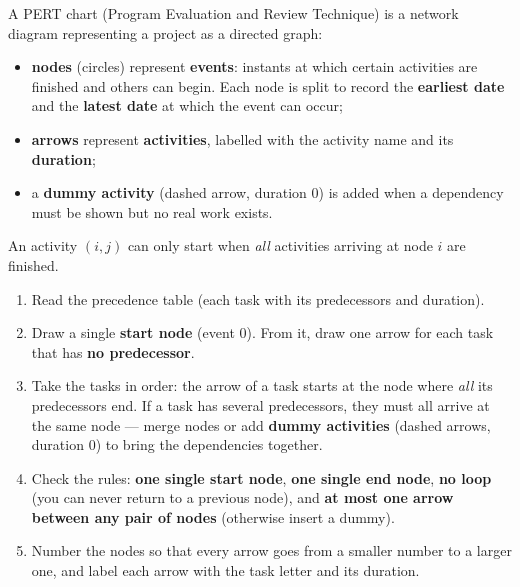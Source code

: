 \documentclass[11pt]{article}
\newcommand{\cle}[1]{{\popxbold\color{popdark}#1}}
\begin{document}
\begin{definition}
A \cle{PERT chart} (Program Evaluation and Review Technique) is a network diagram representing a project as a directed graph:
\begin{itemize}
\item \textbf{nodes} (circles) represent \textbf{events}: instants at which certain activities are finished and others can begin. Each node is split to record the \textbf{earliest date} and the \textbf{latest date} at which the event can occur;
\item \textbf{arrows} represent \textbf{activities}, labelled with the activity name and its \textbf{duration};
\item a \textbf{dummy activity} (dashed arrow, duration 0) is added when a dependency must be shown but no real work exists.
\end{itemize}
An activity $(i,j)$ can only start when \emph{all} activities arriving at node $i$ are finished.
\end{definition}

\begin{methode}
\begin{enumerate}
\item Read the precedence table (each task with its predecessors and duration).
\item Draw a single \textbf{start node} (event 0). From it, draw one arrow for each task that has \textbf{no predecessor}.
\item Take the tasks in order: the arrow of a task starts at the node where \emph{all} its predecessors end. If a task has several predecessors, they must all arrive at the same node --- merge nodes or add \textbf{dummy activities} (dashed arrows, duration 0) to bring the dependencies together.
\item Check the rules: \textbf{one single start node}, \textbf{one single end node}, \textbf{no loop} (you can never return to a previous node), and \textbf{at most one arrow between any pair of nodes} (otherwise insert a dummy).
\item Number the nodes so that every arrow goes from a smaller number to a larger one, and label each arrow with the task letter and its duration.
\end{enumerate}
\end{methode}
\end{document}
